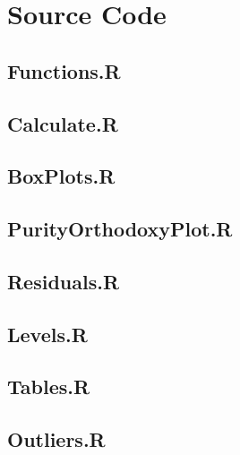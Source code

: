 \chapter{Source Code}

\section{Functions.R}\label{src:functions}


\section{Calculate.R}\label{src:calculate}


\section{BoxPlots.R}\label{src:boxPlots}


\section{PurityOrthodoxyPlot.R}\label{src:purityOrthodoxyPlot}


\section{Residuals.R}\label{src:residuals}


\section{Levels.R}\label{src:levels}


\section{Tables.R}\label{src:tables}


\section{Outliers.R}\label{src:outliers}


